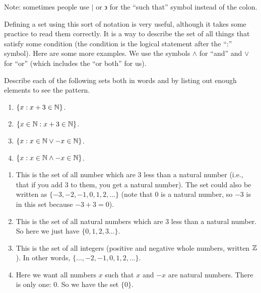 \documentclass[12pt]{article}
\begin{document}
Note: sometimes people use $|$ or $\backepsilon$ for the ``such that'' symbol instead of the colon.

Defining a set using this sort of notation is very useful, although it takes some practice to read them correctly.  It is a way to describe the set of all things that satisfy some condition (the condition is the logical statement after the ``:'' symbol).  Here are some more examples.  We use the symbols $\wedge$ for ``and'' and $\vee$ for ``or'' (which includes the ``or both'' for us).

\begin{example}
Describe each of the following sets both in words and by listing out enough elements to see the pattern.

\begin{multicols}{2}
\begin{enumerate}
\item $\{x : x + 3 \in \mathbb N\}$.
\item $\{x \in \mathbb N : x + 3 \in \mathbb N\}$.
\item $\{x : x \in \mathbb N \vee -x \in \mathbb N\}$.
\item $\{x : x \in \mathbb N \wedge -x \in \mathbb N\}$.
\end{enumerate}
\end{multicols}

\begin{solution}
\begin{enumerate}
\item This is the set of all number which are 3 less than a natural number (i.e., that if you add 3 to them, you get a natural number).  The set could also be written as $\{-3, -2, -1, 0, 1, 2, \ldots\}$ (note that 0 is a natural number, so $-3$ is in this set because $-3 + 3 = 0$).
\item This is the set of all natural numbers which are 3 less than a natural number.  So here we just have $\{0, 1, 2,3 \ldots\}$.
\item This is the set of all integers (positive and negative whole numbers, written $\mathbb Z$).  In other words, $\{\ldots, -2, -1, 0, 1, 2, \ldots\}$.
\item Here we want all numbers $x$ such that $x$ and $-x$ are natural numbers.  There is only one: 0.  So we have the set $\{0\}$.
\end{enumerate}
\end{solution}
\end{example}
\end{document}
